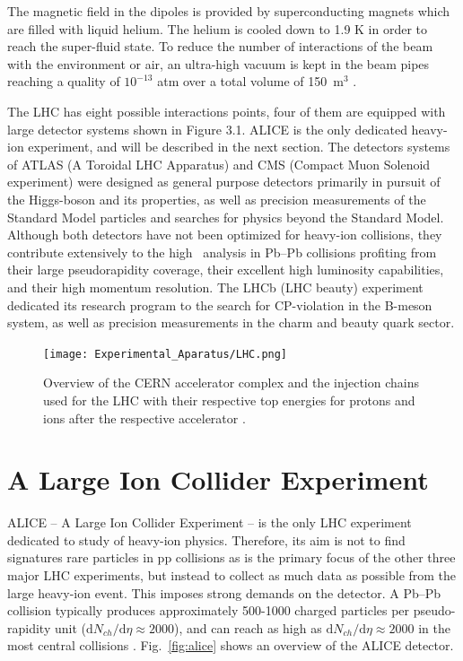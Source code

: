 The magnetic field in the dipoles is provided by superconducting magnets which are filled with liquid helium. The helium is cooled down to 1.9 K in order to reach the super-fluid state. To reduce the number of interactions of the beam with the environment or air, an ultra-high vacuum is kept in the beam pipes reaching a quality of $10^{-13}$ atm over a total volume of 150~m$^3$ \cite{Evans2008}.

The LHC has eight possible interactions points, four of them are equipped with large detector systems shown in Figure 3.1. ALICE is the only dedicated heavy-ion experiment, and will be described in the next section. The detectors systems of ATLAS (A Toroidal LHC Apparatus) and CMS (Compact Muon Solenoid experiment) were designed as general purpose detectors primarily in pursuit of the Higgs-boson and its properties, as well as precision measurements of the Standard Model particles and searches for physics beyond the Standard Model. Although both detectors have not been optimized for heavy-ion collisions, they contribute extensively to the high \pt~analysis in Pb–Pb collisions profiting from their large pseudorapidity coverage, their excellent high luminosity capabilities, and their high momentum resolution. The LHCb (LHC beauty) experiment dedicated its research program to the search for CP-violation in the B-meson system, as well as precision measurements in the charm and beauty quark sector.

\begin{figure}[htpb]
  \centering
	\texttt{[image: Experimental\_Aparatus/LHC.png]}
	\label{fig:lhc}
	\caption{Overview of the CERN accelerator complex and the injection chains used for the LHC with their respective top energies for protons and ions after the respective accelerator \cite{Mobs:2197559}.}
\end{figure}

\FloatBarrier

\section{A Large Ion Collider Experiment}
\label{sec:ALICE}
ALICE – A Large Ion Collider Experiment – is the only LHC experiment dedicated to study of heavy-ion physics. Therefore, its aim is not to find signatures rare particles in pp collisions as is the primary focus of the other three major LHC experiments, but instead to collect as much data as possible from the large heavy-ion event. This imposes strong demands on the detector. A Pb–Pb collision typically produces approximately 500-1000 charged particles per pseudo-rapidity unit ($\text{d}N_{ch}/\text{d}\eta \approx 2000$), and can reach as high as $\text{d}N_{ch}/\text{d}\eta \approx 2000$ in the most central collisions \cite{PhysRevLett.116.222302}. Fig.~\ref{fig:alice} shows an overview of the ALICE detector.


